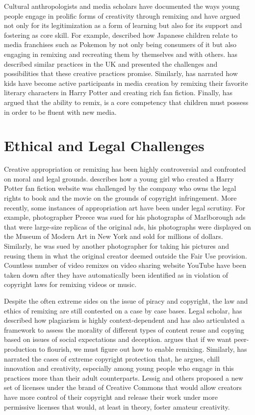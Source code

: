 Cultural anthropologists and media scholars have documented the ways young people engage in prolific forms of creativity through remixing and have argued not only for its legitimization as a form of learning but also for its support and fostering as core skill.
For example, \citet{ito_yugi} described how Japanese children relate to media franchises such as Pokemon by not only being consumers of it but also engaging in remixing and recreating them by themselves and with others.
\citet{livingstone_taking_2008} has described similar practices in the UK and presented the challenges and possibilities that these creative practices promise.
Similarly, \citet{jenkins_convergence_2006} has narrated how kids have become active participants in media creation by remixing their favorite literary characters in Harry Potter and creating rich fan fiction.
Finally, \citet{jenkins_confronting_2009} has argued that the ability to remix, is a core competency that children must possess in order to be fluent with new media.

\section{Ethical and Legal Challenges}
Creative appropriation or remixing has been highly controversial and confronted on moral and legal grounds. 
\citet{jenkins_convergence_2006} describes how a young girl who created a Harry Potter fan fiction website was challenged by the company who owns the legal rights to book and the movie on the grounds of copyright infringement. 
More recently, some instances of appropriation art have been under legal scrutiny. For example, photographer Preece was sued for his photographs of Marlborough ads that were large-size replicas of the original ads, his photographs were displayed on the Museum of Modern Art in New York and sold for millions of dollars.
Similarly, he was sued by another photographer for taking his pictures and reusing them in what the original creator deemed outside the Fair Use provision.
Countless number of video remixes on video sharing website YouTube have been taken down after they have automatically been identified as in violation of copyright laws for remixing videos or music. 

Despite the often extreme sides on the issue of piracy and copyright, the law and ethics of remixing are still contested on a case by case bases. Legal scholar, \citet{posner_little_2007} has described how plagiarism is highly context-dependent and has also articulated a framework to assess the morality of different types of content reuse and copying based on issues of social expectations and deception. 
\citet{benkler_wealth_2006} argues that if we want peer-production to flourish, we must figure out how to enable remixing. Similarly, 
\citet{lessig_remix:2008} has narrated the cases of extreme copyright protection that, he argues, chill innovation and creativity, especially among young people who engage in this practices more than their adult counterparts. Lessig and others proposed a new set of licenses under the brand of Creative Commons that would allow creators have more control of their copyright and release their work under more permissive licenses that would, at least in theory, foster amateur creativity.

